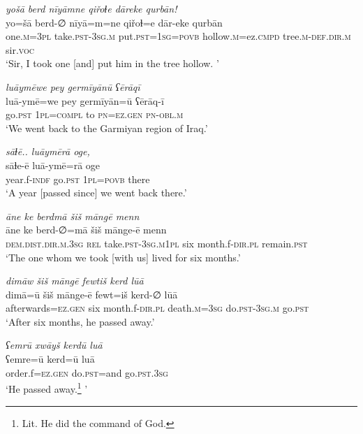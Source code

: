 \ea \label{ZQ.26}
\textit{yošā berd nīyāmne qiřoɫe dāreke qurbān!} \\ 
\gll yo=šā berd-∅ nīyā=m=ne qiřoɫ=e dār-eke qurbān \\ 
 one\textsc{.m}\textsc{=3pl} take\textsc{.pst}\textsc{-3sg}\textsc{.m} put\textsc{.pst}\textsc{=\textsc{1sg}}\textsc{=\textsc{povb}} hollow\textsc{.m}=ez\textsc{.cmpd} tree\textsc{.m}\textsc{-def}\textsc{.dir}\textsc{.m} sir.\textsc{voc} \\ 
\glt `Sir, I took one [and] put him in the tree hollow. '
\z 
 
\ea \label{ZQ.27}
\textit{luāymēwe pey germīyānū ʕērāqī} \\ 
\gll luā-ymē=we pey germīyān=ū ʕērāq-ī \\ 
 go\textsc{.pst} \textsc{1pl}\textsc{=compl} to \textsc{pn}\textsc{=ez.gen} \textsc{pn}\textsc{-obl}\textsc{.m} \\ 
\glt `We went back to the Garmiyan region of Iraq.'
\z 
 
\ea \label{ZQ.28}
\textit{sāɫē.. luāymērā oge,} \\ 
\gll sāɫe-ē luā-ymē=rā oge \\ 
 year.f\textsc{-indf} go\textsc{.pst} \textsc{1pl}\textsc{=\textsc{povb}} there \\ 
\glt `A year [passed since] we went back there.'
\z 
 
\ea \label{ZQ.29}
\textit{āne ke berdmā šiš māngē menn} \\ 
\gll āne ke berd-∅=mā šiš mānge-ē menn \\ 
 \textsc{dem.dist}\textsc{.dir}\textsc{.m}\textsc{.3sg} \textsc{rel} take\textsc{.pst}\textsc{-3sg}\textsc{.m}\textsc{1pl} six month.f\textsc{-dir}\textsc{.pl} remain\textsc{.pst} \\ 
\glt `The one whom we took [with us] lived for six months.'
\z 
 
\ea \label{ZQ.30}
\textit{dimāw šiš māngē fewtiš kerd lūā} \\ 
\gll dimā=ū šiš mānge-ē fewt=iš kerd-∅ lūā \\ 
 afterwards\textsc{=ez.gen} six month.f\textsc{-dir}\textsc{.pl} death\textsc{.m}\textsc{=3sg} do\textsc{.pst}\textsc{-3sg}\textsc{.m} go\textsc{.pst} \\ 
\glt `After six months, he passed away.'
\z 
 
\ea \label{ZQ.31}
\textit{ʕemrū xwāyš kerdū luā} \\ 
\gll ʕemre=ū kerd=ū luā \\ 
 order.f\textsc{=ez.gen} do\textsc{.pst}=and go\textsc{.pst}\textsc{.3sg} \\ 
\glt `He passed away.\footnote{Lit. He did the command of God.} '
\z 
 
